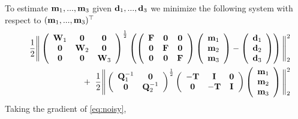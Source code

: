 \documentclass[english]{siamltex}
\newcommand{\bfF}	{{\bf{F}}}
\newcommand{\bfI}	{{\bf{I}}}
\newcommand{\bfL}	{{\bf{L}}}
\newcommand{\bfQ}	{{\bf{Q}}}
\newcommand{\bfT}	{{\bf{T}}}
\newcommand{\bfW}	{{\bf{W}}}
\newcommand{\bfd}	{{\bf{d}}}
\newcommand{\bfm}	{{\bf{m}}}
\newcommand{\hf}        {{\frac 12}}
\newcommand {\zero}  { {\bf 0} }
\renewcommand{\hf}		 {\frac12}
\begin{document}
{To estimate $\bfm_1,...,\bfm_3$ given $\bfd_1,...,\bfd_3$ we minimize the following system with respect to $(\bfm_1,..., \bfm_3)^{\top}$
\begin{eqnarray}
\nonumber
&&\hf\Bigg\|
\left(\begin{array}{ccc}\bfW_1 & \zero & \zero \\ \zero & \bfW_2 & \zero \\ \zero & \zero & \bfW_3 \end{array}\right)^{\hf}	
\left(
\left(\begin{array}{ccc}\bfF & \zero & \zero \\   \zero & \bfF & \zero\\\zero & \zero& \bfF \end{array}\right)	
\left(\begin{array}{c}  \bfm_1  \\ \bfm_2 \\ \bfm_3\end{array}\right) -
\left(\begin{array}{c} \bfd_1   \\ \bfd_2 \\ \bfd_3\end{array}\right)
\right)\Bigg\|^2_2\\
 &&+ \;\;
\hf\Bigg\|
\left(\begin{array}{cc}\bfQ^{-1}_1 & \zero \\ \zero& \bfQ^{-1}_2 \end{array}\right)^{\hf}
\left( \begin{array}{ccc} -\bfT & \bfI & \zero  \\ \zero & -\bfT & \bfI \end{array}\right)
\left(\begin{array}{c}  \bfm_1  \\ \bfm_2 \\ \bfm_3 \end{array}\right)\Bigg\|^2_2
\end{eqnarray}
Taking the gradient of \eqref{eq:noisy},
}
\end{document}
